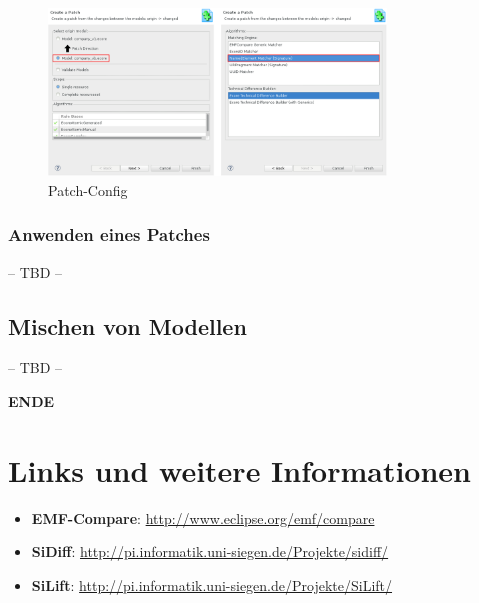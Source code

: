 \documentclass[a4paper]{scrartcl}
\begin{document}
\begin{figure}[H]
\centering
\includegraphics[width=0.8\textwidth]{graphics/silift-tutorial_patching_create_config.png}
\caption{Patch-Config}
\label{silift-tutorial_patching_create_config}
\end{figure}

\subsubsection{Anwenden eines Patches}

-- TBD --

\subsection{Mischen von Modellen}
\label{sec:merging}

-- TBD --


\begin{center}
\textbf{ENDE}
\end{center}

\newpage

\section{Links und weitere Informationen}

\begin{itemize}
\item \textbf{EMF-Compare}: \url{http://www.eclipse.org/emf/compare}
\item \textbf{SiDiff}: \url{http://pi.informatik.uni-siegen.de/Projekte/sidiff/}
\item \textbf{SiLift}: \url{http://pi.informatik.uni-siegen.de/Projekte/SiLift/}
\end{itemize} 

%
%
\end{document}
